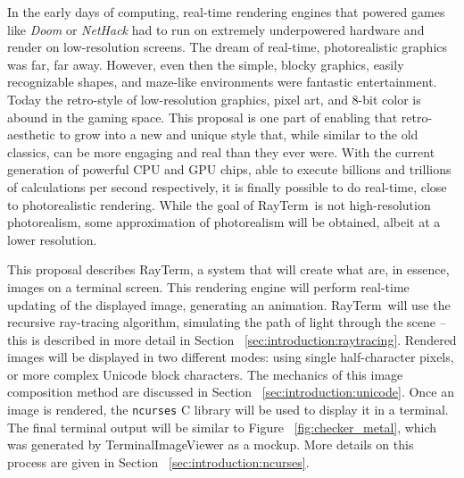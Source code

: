 \documentclass[11pt]{article}
\newcommand{\name}{{\sc RayTerm}}
\begin{document}

In the early days of computing, real-time rendering engines that powered games like {\it Doom} or {\it NetHack} had to run on extremely underpowered hardware and render on low-resolution screens.
The dream of real-time, photorealistic graphics was far, far away.
However, even then the simple, blocky graphics, easily recognizable shapes, and maze-like environments were fantastic entertainment.
Today the retro-style of low-resolution graphics, pixel art, and 8-bit color is abound in the gaming space.
This proposal is one part of enabling that retro-aesthetic to grow into a new and unique style that, while similar to the old classics, can be more engaging and real than they ever were.
With the current generation of powerful CPU and GPU chips, able to execute billions and trillions of calculations per second respectively, it is finally possible to do real-time, close to photorealistic rendering.
While the goal of \name\ is not high-resolution photorealism, some approximation of photorealism will be obtained, albeit at a lower resolution.


This proposal describes \name, a system that will create what are, in essence, images on a terminal screen.
This rendering engine will perform real-time updating of the displayed image, generating an animation.
\name\ will use the recursive ray-tracing algorithm, simulating the path of light through the scene -- this is described in more detail in Section ~\ref{sec:introduction:raytracing}.
Rendered images will be displayed in two different modes: using single half-character pixels, or more complex Unicode block characters.
The mechanics of this image composition method are discussed in Section ~\ref{sec:introduction:unicode}.
Once an image is rendered, the \texttt{ncurses} C library \cite{ncursesLibrary} will be used to display it in a terminal.
The final terminal output will be similar to Figure ~\ref{fig:checker_metal}, which was generated by TerminalImageViewer \cite{tivGithub} as a mockup.
More details on this process are given in Section ~\ref{sec:introduction:ncurses}.
\end{document}
